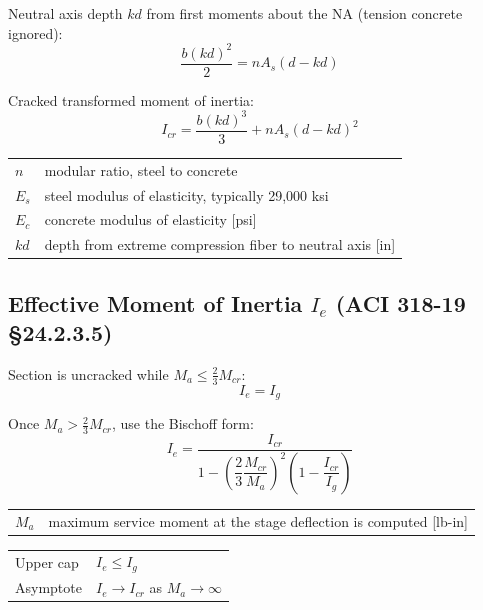 \documentclass[10pt]{article}
\begin{document}
Neutral axis depth $kd$ from first moments about the NA (tension concrete ignored):
\begin{equation}
\frac{b (kd)^2}{2} = n A_s (d - kd)
\end{equation}

Cracked transformed moment of inertia:
\begin{equation}
I_{cr} = \frac{b (kd)^3}{3} + n A_s (d - kd)^2
\end{equation}

{\ttfamily\footnotesize
\begin{tabular}{@{}ll@{}}
$n$ & modular ratio, steel to concrete \\
$E_s$ & steel modulus of elasticity, typically 29{,}000 ksi \\
$E_c$ & concrete modulus of elasticity [psi] \\
$kd$ & depth from extreme compression fiber to neutral axis [in] \\
\end{tabular}
}

\subsection{Effective Moment of Inertia $I_e$ (ACI 318-19 \S 24.2.3.5)}

Section is uncracked while $M_a \leq \tfrac{2}{3} M_{cr}$:
\begin{equation}
I_e = I_g
\end{equation}

Once $M_a > \tfrac{2}{3} M_{cr}$, use the Bischoff form:
\begin{equation}
I_e = \frac{I_{cr}}{1 - \left( \dfrac{2}{3} \dfrac{M_{cr}}{M_a} \right)^{\!2} \!\left( 1 - \dfrac{I_{cr}}{I_g} \right)}
\end{equation}

{\ttfamily\footnotesize
\begin{tabular}{@{}ll@{}}
$M_a$ & maximum service moment at the stage deflection is computed [lb-in] \\
\end{tabular}
}


{\ttfamily\footnotesize
\begin{tabular}{@{}p{2.3in}p{4.0in}@{}}
Upper cap & $I_e \leq I_g$ \\
Asymptote & $I_e \to I_{cr}$ as $M_a \to \infty$ \\
\end{tabular}
}
\end{document}

